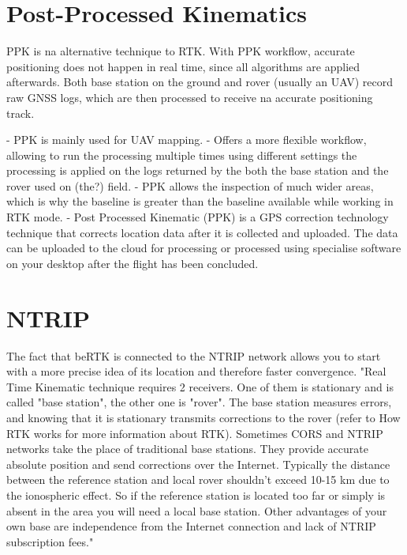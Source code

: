 \section{Post-Processed Kinematics}\label{sec:II_ppk}

PPK is na alternative technique to RTK. With PPK workflow, accurate positioning does not happen in real time, since all algorithms are applied afterwards. Both base station on the ground and rover (usually an UAV) record raw GNSS logs, which are then processed to receive na accurate positioning track.

- PPK is mainly used for UAV mapping.
- Offers a more flexible workflow, allowing to run the processing multiple times using different settings the processing is applied on the logs returned by the both the base station and the rover used on (the?) field.
- PPK allows the inspection of much wider areas, which is why the baseline is greater than the baseline available while working in RTK mode.
- Post Processed Kinematic (PPK) is a GPS correction technology technique that corrects location data after it is collected and uploaded. The data can be uploaded to the cloud for processing or processed using specialise software on your desktop after the flight has been concluded.

\section{NTRIP}\label{sec:II_ntrip}

The fact that beRTK is connected to the NTRIP network allows you to start with a more precise idea of its location and therefore faster convergence.
"Real Time Kinematic technique requires 2 receivers. One of them is stationary and is called "base station", the other one is "rover". The base station measures errors, and knowing that it is stationary transmits corrections to the rover (refer to How RTK works for more information about RTK). Sometimes CORS and NTRIP networks take the place of traditional base stations. They provide accurate absolute position and send corrections over the Internet. Typically the distance between the reference station and local rover shouldn't exceed 10-15 km due to the ionospheric effect. So if the reference station is located too far or simply is absent in the area you will need a local base station. Other advantages of your own base are independence from the Internet connection and lack of NTRIP subscription fees."

